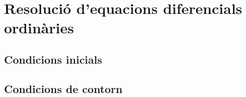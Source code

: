 \section{Resolució d'equacions diferencials ordinàries}
\subsection{Condicions inicials}

\subsection{Condicions de contorn}
